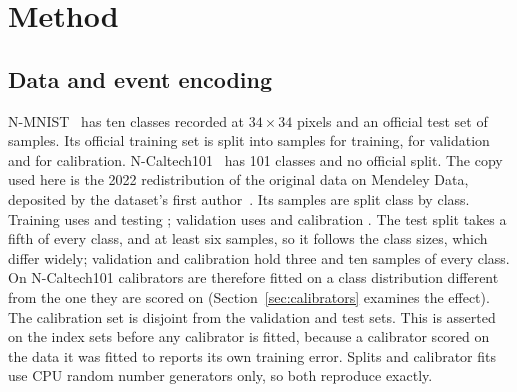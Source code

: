 \documentclass[10pt]{article}
\begin{document}
\section{Method}
\label{sec:method}

\subsection{Data and event encoding}
\label{sec:data}

N-MNIST~\citep{orchard2015converting} has ten classes recorded at $34\times34$ pixels and an %
official test set of \nmSplitTest{} samples. Its official training set is split into %
\nmSplitTrain{} samples for training, \nmSplitVal{} for validation and \nmSplitCal{} for calibration. %
\mbox{N-Caltech101}~\citep{orchard2015converting} has 101 classes and no official split. The copy used %
here is the 2022 redistribution of the original data on Mendeley Data, deposited by the dataset's
first author~\citep{ncaltech101mirror}. Its \ncSplitTotal{} samples are split class by class. %
Training uses \ncSplitTrain{} and testing \ncSplitTest; validation uses \ncSplitVal{} and %
calibration \ncSplitCal. The test split takes a fifth of every class, and at least six samples, %
so it follows the class sizes, which differ widely; validation and calibration hold three and ten
samples of every class. On N-Caltech101 calibrators are therefore fitted on a class distribution
different from the one they are scored on (Section~\ref{sec:calibrators} examines the effect). The %
calibration set is disjoint from the validation and test sets. This is asserted on the index sets before any calibrator is fitted, because a calibrator
scored on the data it was fitted to reports its own training error. Splits and calibrator fits
use CPU random number generators only, so both reproduce exactly.
\end{document}
